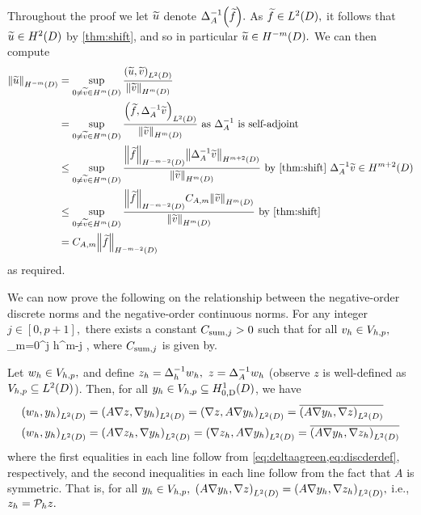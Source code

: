 Throughout the proof we let $\widetilde{u}$ denote $\DeltaAI\mleft(\ftilde\mright).$ As $\ftilde \in \LtD,$ it follows that $\utilde \in \HtD$ by \cref{thm:shift}, and so in particular $\utilde \in \HmmD.$ We can then compute
\begin{align*}
\NHmmD{\utilde} &= \sup_{0 \neq \vtilde \in \HmD} \frac{\IPLtD{\utilde}{\vtilde}}{\NHmD{\vtilde}}\\
&= \sup_{0 \neq \vtilde \in \HmD} \frac{\IPLtD{\ftilde}{\DeltaAI\vtilde}}{\NHmD{\vtilde}}\text{ as } \DeltaAI \text{ is self-adjoint}\\
&\leq \sup_{0 \neq \vtilde \in \HmD} \frac{\NHmmmtD{\ftilde}\NHmptD{\DeltaAI\vtilde}}{\NHmD{\vtilde}} \text{ by \cref{thm:shift} } \DeltaAI\vtilde \in \HmptD\\
&\leq \sup_{0 \neq \vtilde \in \HmD} \frac{\NHmmmtD{\ftilde}\CAm\NHmD{\vtilde}}{\NHmD{\vtilde}} \text{ by \cref{thm:shift}}\\
&= \CAm \NHmmmtD{\ftilde}
\end{align*}
as required.
\epf

We can now prove the following  on the relationship between the negative-order discrete norms and the negative-order continuous norms.
\label{lem:negdiscsum}
For any integer $j \in [0,p+1],$ there exists a constant $C_{\mathrm{sum},j} > 0$ such that for all $v_{h} \in V_{h,p},$
\beqs
\Nmjh{\vh} \leq \Csumj \sum_{m=0}^j h^{m-j} \NHmmD{\vh},
\eeqs
where $C_{\mathrm{sum},j}$ is given by.
\ele

Let $w_{h} \in V_{h,p},$ and define $z_{h} = \Delta_{h}^{-1} w_{h},$ $z = \Delta_{A}^{-1} w_{h}$ (observe $z$ is well-defined as $\Vhp \subseteq \LtD$). Then, for all $\yh \in \Vhp \subseteq \HozDD$, we have
\begin{align*}
\IPLtD{\wh}{\yh} &= \IPLtD{A \grad z}{\grad \yh} = \IPLtD{\grad z}{A\grad \yh} = \overline{\IPLtD{A\grad \yh}{\grad z}} \\
\IPLtD{\wh}{\yh} &= \IPLtD{A \grad \zh}{\grad \yh} = \IPLtD{\grad \zh}{A\grad \yh} = \overline{\IPLtD{A\grad \yh}{\grad \zh}}
\end{align*}
where the first equalities in each line follow from \cref{eq:deltaagreen,eq:discderdef}, respectively, and the second inequalities in each line follow from the fact that $A$ is symmetric. That is, for all $y_{h} \in V_{h,p},$ $\IPLtD{A\grad \yh}{\grad z} = \IPLtD{A\grad \yh}{\grad \zh},$ i.e., $z_{h} = \mathcal P_{h} z.$

